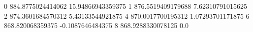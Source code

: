 0 884.8775024414062 15.94866943359375
1 876.5519409179688 7.62310791015625
2 874.3601684570312 5.43133544921875
4 870.0017700195312 1.07293701171875
6 868.820068359375 -0.1087646484375
8 868.9288330078125 0.0
